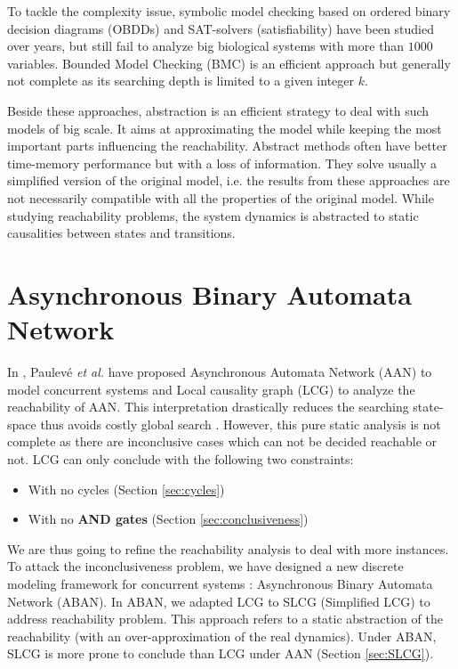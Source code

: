 To tackle the complexity issue, symbolic model checking \cite{burch1992symbolic} based on ordered binary decision diagrams (OBDDs) and SAT-solvers (satisfiability) \cite{abdulla2000symbolic} have been studied over years, but still fail to analyze big biological systems with more than $1000$ variables. 
Bounded Model Checking (BMC) \cite{clarke2001bounded} is an efficient approach but generally not complete as its searching depth is limited to a given integer $k$.

Beside these approaches, abstraction is an efficient strategy to deal with such models of big scale. 
It aims at approximating the model while keeping the most important parts influencing the reachability.
Abstract methods often have better time-memory performance but with a loss of information. 
They solve usually a simplified version of the original model, i.e. the results from these approaches are not necessarily compatible with all the properties of the original model.
While studying reachability problems, the system dynamics is abstracted to static causalities between states and transitions.

\section{Asynchronous Binary Automata Network}
In \cite{folschette2015}, Paulev\'e \textit{et al.} have proposed Asynchronous Automata Network (AAN) to model concurrent systems and Local causality graph (LCG) \cite{pauleve2017reduction,folschette2015,pauleve2011} to analyze the reachability of AAN.
This interpretation drastically reduces the searching state-space thus avoids costly global search \cite{pauleve2012}. 
However, this pure static analysis is not complete as there are inconclusive cases which can not be decided reachable or not.
LCG can only conclude with the following two constraints:
\begin{itemize}
    \item With no cycles (Section \ref{sec:cycles})
    \item With no \textbf{AND gates} (Section \ref{sec:conclusiveness})
\end{itemize}
We are thus going to refine the reachability analysis to deal with more instances.
To attack the inconclusiveness problem, we have designed a new discrete modeling framework for concurrent systems \cite{chai2018heuristic}: Asynchronous Binary Automata Network (ABAN).
In ABAN, we adapted LCG to SLCG (Simplified LCG) to address reachability problem.
This approach refers to a static abstraction of the reachability (with an over-approximation of the real dynamics).
Under ABAN, SLCG is more prone to conclude than LCG under AAN (Section \ref{sec:SLCG}).

